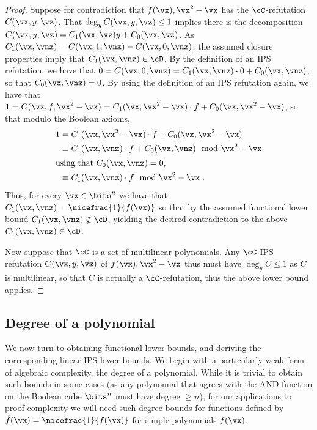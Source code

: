 \documentclass{toc}
\begin{document}
\begin{proof}
        Suppose for contradiction that $f(\vx),\vx^2-\vx$ has the $\cC$-\lbIPS refutation $C(\vx,y,\vz)$.  That $\deg_{y} C(\vx,y,\vz)\le 1$ implies there is the decomposition $C(\vx,y,\vz)=C_1(\vx,\vz)y+C_0(\vx,\vz)$.  As $C_1(\vx,\vnz)=C(\vx,1,\vnz)-C(\vx,0,\vnz)$, the assumed closure properties imply that $C_1(\vx,\vnz)\in\cD$. By the definition of an IPS refutation, we have that $0=C(\vx,0,\vnz)=C_1(\vx,\vnz)\cdot 0+C_0(\vx,\vnz)$, so that $C_0(\vx,\vnz)=0$. By using the definition of an IPS refutation again, we have that $1=C(\vx,f,\vx^2-\vx)=C_1(\vx,\vx^2-\vx)\cdot f+C_0(\vx,\vx^2-\vx)$, so that modulo the Boolean axioms,
        \begin{align*}
                1&=\textstyle C_1(\vx,\vx^2-\vx)\cdot f+C_0(\vx,\vx^2-\vx) \\
                &\equiv \textstyle C_1(\vx,\vnz)\cdot f+C_0(\vx,\vnz) \mod \vx^2-\vx\\
                \intertext{using that $C_0(\vx,\vnz)=0$,}
                &\equiv \textstyle C_1(\vx,\vnz)\cdot f \mod \vx^2-\vx
                \;.
        \end{align*}
        Thus, for every $\vx\in\bits^n$ we have that $C_1(\vx,\vnz)=\nicefrac{1}{f(\vx)}$ so that by the assumed functional lower bound $C_1(\vx,\vnz)\notin \cD$, yielding the desired contradiction to the above $C_1(\vx,\vnz)\in\cD$.

        Now suppose that $\cC$ is a set of multilinear polynomials.  Any $\cC$-IPS refutation $C(\vx,y,\vz)$ of $f(\vx),\vx^2-\vx$ thus must have $\deg_y C\le 1$ as $C$ is multilinear, so that $C$ is actually a $\cC$-\lbIPS refutation, thus the above lower bound applies.
\end{proof}

\subsection{Degree of a polynomial}\label{sec:lbs-fn:deg}

We now turn to obtaining functional lower bounds, and deriving the corresponding linear-IPS lower bounds. We begin with a particularly weak form of algebraic complexity, the degree of a polynomial.  While it is trivial to obtain such bounds in some cases (as any polynomial that agrees with the AND function on the Boolean cube $\bits^n$ must have degree $\ge n$), for our applications to proof complexity we will need such degree bounds for functions defined by $\hat{f}(\vx)=\nicefrac{1}{f(\vx)}$ for simple polynomials $f(\vx)$.
\end{document}
